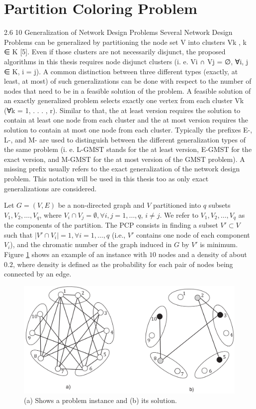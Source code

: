 \section{Partition Coloring Problem}

2.6
10
Generalization of Network Design Problems
Several Network Design Problems can be generalized by partitioning the node set V into
clusters Vk , k ∈ K [5]. Even if those clusters are not necessarily disjunct, the proposed
algorithms in this thesis requires node disjunct clusters (i. e. Vi ∩ Vj = ∅, ∀i, j ∈ K, i = j).
A common distinction between three different types (exactly, at least, at most) of such
generalizations can be done with respect to the number of nodes that need to be in a feasible
solution of the problem.
A feasible solution of an exactly generalized problem selects exactly one vertex from each
cluster Vk (∀k = 1, . . . , r). Similar to that, the at least version requires the solution to
contain at least one node from each cluster and the at most version requires the solution to
contain at most one node from each cluster.
Typically the prefixes E-, L-, and M- are used to distinguish between the different
generalization types of the same problem (i. e. L-GMST stands for the at least version,
E-GMST for the exact version, and M-GMST for the at most version of the GMST problem).
A missing prefix usually refers to the exact generalization of the network design problem.
This notation will be used in this thesis too as only exact generalizations are considered.

Let $G = (V, E)$ be a non-directed graph and $V$ partitioned into $q$ subsets $V_1, V_2,\ldots, V_q$, where $V_i \cap V_j = \emptyset, \forall i, j = 1, \ldots , q$, $i \neq j$. We refer to $V_1, V_2, \ldots , V_q$ as the components of the partition. The PCP consists in finding a subset $V' \subset V$ such that $|V' \cap V_i| = 1, \forall i = 1, \ldots , q$ (i.e., $V'$ contains one node of each component $V_i$), and the chromatic number of the graph induced in $G$ by $V'$ is minimum.\\
Figure \ref{pd:pcpExample} shows an example of an instance with $10$ nodes and a density of about $0.2$, where density is defined as the probability for each pair of nodes being connected by an edge.

\begin{figure}
\begin{center}
\includegraphics[scale=0.3]{figures/pcp.png}
\caption{(a) Shows a problem instance and (b) its solution.}
\label{pd:pcpExample}
\end{center}
\end{figure}


